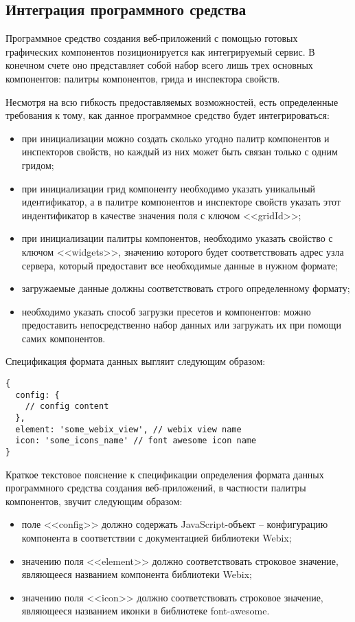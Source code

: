 \subsection{Интеграция программного средства}
\label{sec:manual:integration}

Программное средство создания веб-приложений с помощью готовых графических компонентов позиционируется как интегрируемый сервис. В конечном счете оно представляет собой набор всего лишь трех основных компонентов: палитры компонентов, грида и инспектора свойств. 

Несмотря на всю гибкость предоставляемых возможностей, есть определенные требования к тому, как данное программное средство будет интегрироваться:
\begin{itemize}
	\item при инициализации можно создать сколько угодно палитр компонентов и инспекторов свойств, но каждый из них может быть связан только с одним гридом;
	\item при инициализации грид компоненту необходимо указать уникальный идентификатор, а в палитре компонентов и инспекторе свойств указать этот индентификатор в качестве значения поля с ключом <<gridId>>;
	\item при инициализации палитры компонентов, необходимо указать свойство с ключом <<widgets>>, значению которого будет соответствовать адрес узла сервера, который предоставит все необходимые данные в нужном формате;
	\item загружаемые данные должны соответствовать строго определенному формату;
	\item необходимо указать способ загрузки пресетов и компонентов: можно предоставить непосредственно набор данных или загружать их при помощи самих компонентов. 
\end{itemize}

Спецификация формата данных выгляит следующим образом:
\begin{lstlisting}
{
  config: { 
    // config content
  },
  element: 'some_webix_view', // webix view name
  icon: 'some_icons_name' // font awesome icon name
}
\end{lstlisting}

Краткое текстовое пояснение к спецификации определения формата данных программного средства создания веб-приложений, в частности палитры компонентов, звучит следующим образом:
\begin{itemize}
	\item поле <<config>> должно содержать JavaScript-объект -- конфигурацию компонента в соответствии с документацией библиотеки Webix;
	\item значению поля <<element>> должно соответствовать строковое значение, являющееся названием компонента библиотеки Webix;
	\item значению поля <<icon>> должно соответствовать строковое значение, являющееся названием иконки в библиотеке font-awesome.
\end{itemize}

